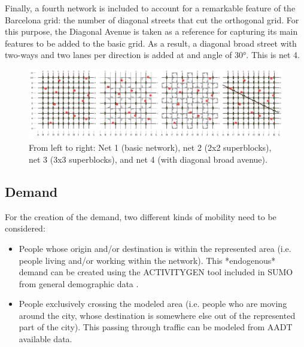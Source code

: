 \documentclass[11pt]{article}
\begin{document}
Finally, a fourth network is included to account for a remarkable feature of the Barcelona grid: the number of diagonal streets that cut the orthogonal grid. For this purpose, the Diagonal Avenue is taken as a reference for capturing its main features to be added to the basic grid. As a result, a diagonal broad street with two-ways and two lanes per direction is added at and angle of 30°. This is net 4.

\begin{figure}[htbp]
\centering
\includegraphics[width=\textwidth]{bcn_paradox_4nets.PNG}
\caption{From left to right: Net 1 (basic network), net 2 (2x2 superblocks), net 3 (3x3 superblocks), and net 4 (with diagonal broad avenue).}
\label{fig:From left to right: Net 1 (basic network), net 2 (2x2 superblocks), net 3 (3x3 superblocks), and net 4 (with diagonal broad avenue).}
\end{figure}


\begin{table}[htbp]
\centering
\caption{Main metrics for each network.}
\label{tab:Nets-features}
\end{table}

\subsection {Demand}

For the creation of the demand, two different kinds of mobility need to be considered:
\begin{itemize}
    \item People whose origin and/or destination is within the represented area (i.e. people living and/or working within the network). This *endogenous* demand can be created using the ACTIVITYGEN tool included in SUMO from general demographic data \citep{Lopez2018}.
    \item People exclusively crossing the modeled area (i.e. people who are moving around the city, whose destination is somewhere else out of the represented part of the city). This passing through traffic can be modeled from AADT available data.
\end{itemize}
\end{document}
